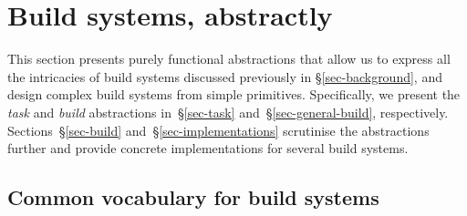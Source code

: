 \section{Build systems, abstractly}\label{sec-abstractions}

This section presents purely functional abstractions that allow us to express
all the intricacies of build systems discussed previously in \S\ref{sec-background},
and design complex build systems from simple
primitives. Specifically, we present the \emph{task} and \emph{build}
abstractions in~\S\ref{sec-task} and~\S\ref{sec-general-build}, respectively.
Sections~\S\ref{sec-build} and~\S\ref{sec-implementations} scrutinise the
abstractions further and provide concrete implementations for several build
systems.

\subsection{Common vocabulary for build systems}\label{sec-vocabulary}
